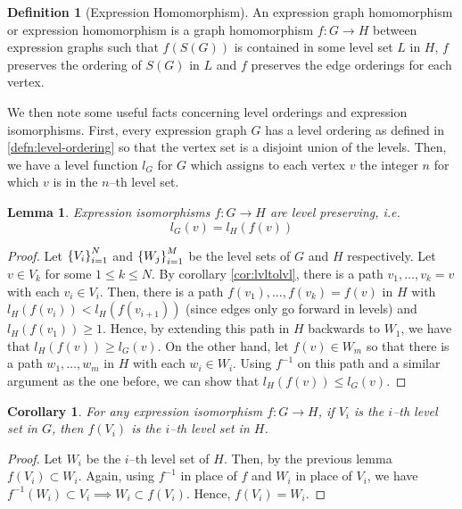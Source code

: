 \documentclass{amsart}
\renewcommand{\to}[1][]{\stackrel{#1}{\longrightarrow}}
\newcommand{\curly}[1]{\left\{ #1 \right\}}
\newcommand{\set}[2][]{\ifthenelse{\equal{#1}{}}
                                  {\curly{#2}}
                                  {\curly{#1\ \textbf{:}\ #2}}}
\numberwithin{thm}{section}
\newtheorem{lem}[thm]{Lemma}
\newtheorem{cor}[thm]{Corollary}
\theoremstyle{definition}
\newtheorem{defn}[thm]{Definition}
\begin{document}
\begin{defn}[Expression Homomorphism]
An expression graph homomorphism or expression homomorphism is a graph
homomorphism $f : G \to H$ between expression graphs such that $f(S(G))$ is
contained in some level set $L$ in $H$, $f$ preserves the ordering of $S(G)$ in
$L$ and $f$ preserves the edge orderings for each vertex.
\end{defn}

We then note some useful facts concerning level orderings and expression
isomorphisms. First, every expression graph $G$ has a level ordering as
defined in \ref{defn:level-ordering} so that the vertex
set is a disjoint union of the levels. Then, we have a level function $l_G$ for
$G$ which assigns to each vertex $v$ the integer $n$ for which $v$ is in the
$n$--th level set.

\begin{lem}\label{thm:expiso_lvlpres}
Expression isomorphisms $f : G \to H$ are level preserving, i.e.
\[
  l_G(v) = l_H(f(v))
\]
\end{lem}
\begin{proof}
Let
$\set{V_i}_{i = 1}^{N}$ and
$\set{W_j}_{i = 1}^{M}$ be the level sets of $G$ and $H$
respectively. Let $v \in V_k$ for some $1 \leq k \leq N$.
By corollary \ref{cor:lvltolvl}, there is a path $v_1, \dots, v_k = v$ with each
$v_i \in V_i$. Then, there is a path $f(v_1), \dots, f(v_k) = f(v)$ in $H$ with
$l_H(f(v_{i})) < l_H(f(v_{i + 1}))$ (since edges only go forward in levels) and
$l_H(f(v_1)) \geq 1$. Hence, by extending this path in $H$ backwards to $W_1$,
we have that $l_H(f(v)) \geq l_G(v)$.
On the other hand, let $f(v) \in W_m$ so that there is
a path $w_1, \dots, w_m$ in $H$ with each $w_i \in W_i$. Using $f^{-1}$ on this
path and a similar argument as the one before, we can show that
$l_H(f(v)) \leq l_G(v)$.
\end{proof}

\begin{cor}
For any expression isomorphism $f : G \to H$, if $V_i$ is the $i$--th level set
in $G$, then $f(V_i)$ is the $i$--th level set in $H$.
\end{cor}
\begin{proof}
Let $W_i$ be the $i$--th level set of $H$. Then, by the previous lemma
$f(V_i) \subset W_i$. Again, using $f^{-1}$ in place of $f$ and $W_i$ in place
of $V_i$, we have
$f^{-1}(W_i) \subset V_i \implies W_i \subset f(V_i)$. Hence, $f(V_i) = W_i$.
\end{proof}
\end{document}
